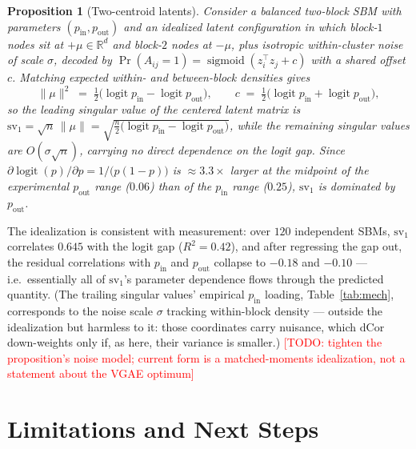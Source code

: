 \documentclass[11pt]{article}
\newcommand{\todo}[1]{\textcolor{red}{[TODO: #1]}}
\newtheorem{proposition}{Proposition}
\begin{document}
\begin{proposition}[Two-centroid latents]\label{prop:centroids}
Consider a balanced two-block SBM with parameters $(p_{\mathrm{in}},
p_{\mathrm{out}})$ and an idealized latent configuration in which block-$1$
nodes sit at $+\mu \in \mathbb{R}^d$ and block-$2$ nodes at $-\mu$, plus
isotropic within-cluster noise of scale $\sigma$, decoded by
$\Pr(A_{ij} = 1) = \operatorname{sigmoid}(z_i^{\top} z_j + c)$ with a shared
offset $c$. Matching expected within- and between-block densities gives
\[
\|\mu\|^2 \;=\; \tfrac{1}{2}\bigl(\operatorname{logit} p_{\mathrm{in}} -
\operatorname{logit} p_{\mathrm{out}}\bigr),
\qquad
c \;=\; \tfrac{1}{2}\bigl(\operatorname{logit} p_{\mathrm{in}} +
\operatorname{logit} p_{\mathrm{out}}\bigr),
\]
so the leading singular value of the centered latent matrix is
$\mathrm{sv}_1 = \sqrt{n}\,\|\mu\| =
\sqrt{\tfrac{n}{2}\bigl(\operatorname{logit} p_{\mathrm{in}} -
\operatorname{logit} p_{\mathrm{out}}\bigr)}$, while the remaining singular
values are $O(\sigma\sqrt{n})$, carrying no direct dependence on the logit
gap. Since $\partial \operatorname{logit}(p) / \partial p = 1/\bigl(p(1 -
p)\bigr)$ is $\approx 3.3\times$ larger at the midpoint of the experimental
$p_{\mathrm{out}}$ range ($0.06$) than of the $p_{\mathrm{in}}$ range
($0.25$), $\mathrm{sv}_1$ is dominated by $p_{\mathrm{out}}$.
\end{proposition}

The idealization is consistent with measurement: over $120$ independent SBMs,
$\mathrm{sv}_1$ correlates $0.645$ with the logit gap ($R^2 = 0.42$), and
after regressing the gap out, the residual correlations with
$p_{\mathrm{in}}$ and $p_{\mathrm{out}}$ collapse to $-0.18$ and $-0.10$ ---
i.e.\ essentially all of $\mathrm{sv}_1$'s parameter dependence flows through
the predicted quantity. (The trailing singular values' empirical
$p_{\mathrm{in}}$ loading, Table~\ref{tab:mech}, corresponds to the noise
scale $\sigma$ tracking within-block density --- outside the idealization but
harmless to it: those coordinates carry nuisance, which dCor down-weights only
if, as here, their variance is smaller.) \todo{tighten the proposition's
noise model; current form is a matched-moments idealization, not a statement
about the VGAE optimum}

\section{Limitations and Next Steps}\label{sec:limitations}
\end{document}
